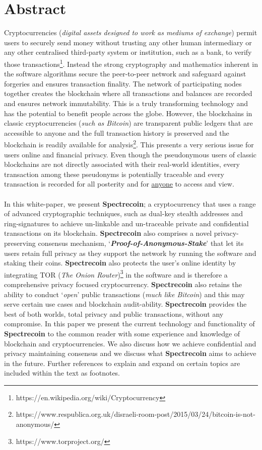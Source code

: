 \section{Abstract}
Cryptocurrencies (\textit{digital assets designed to work as mediums of exchange})
permit users to securely send money without trusting any other human intermediary
or any other centralised third-party system or institution, such as a bank, to
verify those transactions\footnote{https://en.wikipedia.org/wiki/Cryptocurrency}.
Instead the strong cryptography and mathematics inherent in the software
algorithms secure the peer-to-peer network and safeguard against forgeries and
ensures transaction finality. The network of participating nodes together
creates the blockchain where all transactions and balances are recorded and
ensures network immutability. This is a truly transforming technology and has
the potential to benefit people across the globe. However, the blockchains in
classic cryptocurrencies (\textit{such as Bitcoin}) are transparent public
ledgers that are accessible to anyone and the full transaction history is
preserved and the blockchain is readily available for analysis\footnote{https://www.respublica.org.uk/disraeli-room-post/2015/03/24/bitcoin-is-not-anonymous/}. This presents a very serious issue for users online and financial privacy.
Even though the pseudonymous users of classic blockchains are not directly
associated with their real-world identities, every transaction among these
pseudonyms is potentially traceable and every transaction is recorded for
all posterity and for \underline{anyone} to access and view.
\\
\\
In this white-paper, we present \textbf{Spectrecoin}; a cryptocurrency that
uses a range of advanced cryptographic techniques, such as dual-key stealth
addresses and ring-signatures to achieve un-linkable and un-traceable
private and confidential transactions on its blockchain. \textbf{Spectrecoin}
also comprises a novel privacy-preserving consensus mechanism,
‘\textbf{\textit{Proof-of-Anonymous-Stake}}’ that let its users retain
full privacy as they support the network by running the software and
staking their coins. \textbf{Spectrecoin} also protects the user’s online
identity by integrating TOR (\textit{The Onion Router})\footnote{https://www.torproject.org/} 
in the software and is therefore a
comprehensive privacy focused cryptocurrency. \textbf{Spectrecoin} also
retains the ability to conduct ‘\textit{open}’ public transactions
(\textit{much like Bitcoin}) and this may serve certain use cases and
blockchain audit-ability. \textbf{Spectrecoin} provides the best of both
worlds, total privacy and public transactions, without any compromise.
In this paper we present the current technology and functionality of
\textbf{Spectrecoin} to the common reader with some experience and knowledge
of blockchain and cryptocurrencies. We also discuss how we achieve
confidential and privacy maintaining consensus and we discuss what
\textbf{Spectrecoin} aims to achieve in the future. Further references
to explain and expand on certain topics are included within the text as
footnotes.
